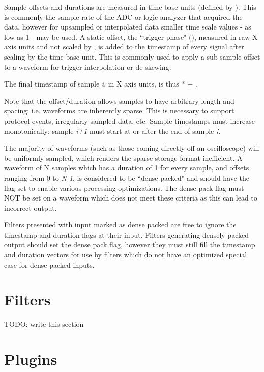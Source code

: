 Sample offsets and durations are measured in time base units (defined by ). This is commonly
the sample rate of the ADC or logic analyzer that acquired the data, however for upsampled or interpolated data smaller
time scale values - as low as 1 - may be used. A static offset, the ``trigger phase" (),
measured in raw X axis units and not scaled by , is added to the timestamp of every signal
after scaling by the time base unit. This is commonly used to apply a sub-sample offset to a waveform for trigger
interpolation or de-skewing.

The final timestamp of sample \emph{i}, in X axis units, is thus * +
.

Note that the offset/duration allows samples to have arbitrary length and spacing; i.e. waveforms are inherently
sparse. This is necessary to support protocol events, irregularly sampled data, etc. Sample timestamps must increase
monotonically: sample \emph{i+1} must start at or after the end of sample \emph{i}.

The majority of waveforms (such as those coming directly off an oscilloscope) will be uniformly sampled, which renders
the sparse storage format inefficient. A waveform of N samples which has a duration of 1 for every sample, and offsets
ranging from 0 to \emph{N-1}, is considered to be ``dense packed" and should have the  flag
set to enable various processing optimizations. The dense pack flag must NOT be set on a waveform which does not meet
these criteria as this can lead to incorrect output.

Filters presented with input marked as dense packed are free to ignore the timestamp and duration flags at their input.
Filters generating densely packed output should set the dense pack flag, however they must still fill the timestamp and
duration vectors for use by filters which do not have an optimized special case for dense packed inputs.

\section{Filters}
\label{sec:filters}

TODO: write this section

\section{Plugins}

